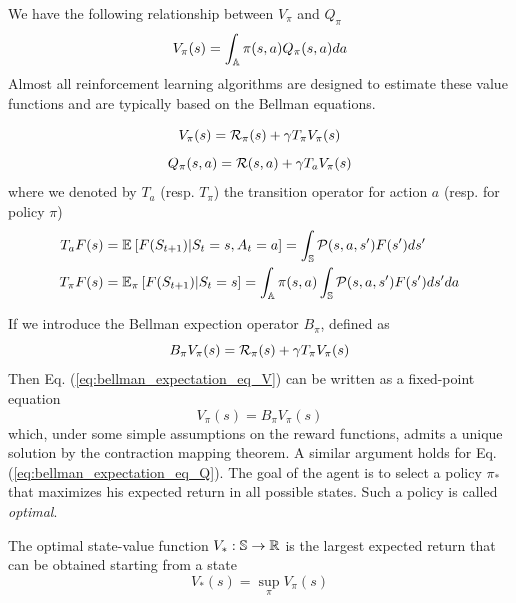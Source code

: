 We have the following relationship between $V_\pi$ and $Q_\pi$
\begin{equation}
	V_\pi(s) = \int_\A \pi(s,a) Q_\pi(s,a) da
\end{equation}
Almost all reinforcement learning algorithms are designed to estimate these 
value functions and are typically based on the Bellman equations.
\begin{proposition}
	\begin{equation}
		V_\pi(s) = \calR_\pi(s) + \gamma T_\pi V_\pi(s)	
		\label{eq:bellman_expectation_eq_V}
	\end{equation}
	\begin{equation}
			Q_\pi(s,a) = \calR(s,a) + \gamma T_a V_\pi(s)
			\label{eq:bellman_expectation_eq_Q}
	\end{equation}
	where we denoted by $T_a$ (resp. $T_\pi$) the transition operator for action 
	$a$ (resp. for policy $\pi$)
	\begin{equation*}
		\begin{split}
			T_a F(s) &= \E{F(S_{t+1})|S_t = s, A_t = a} = \int_\S \calP(s, a, s') F(s') ds'\\
			T_\pi F(s) &= \E[\pi]{F(S_{t+1})|S_t = s} = \int_\A \pi(s,a) \int_\S \calP(s,a,s') F(s') ds'
			da\\ 
		\end{split}
	\end{equation*}
\end{proposition}
If we introduce the Bellman expection operator $B_\pi$, defined as 
\begin{equation*}
	B_\pi V_\pi(s) = \calR_\pi(s) + \gamma T_\pi V_\pi(s)	
\end{equation*}
Then Eq. (\ref{eq:bellman_expectation_eq_V}) can be written as a fixed-point equation
\begin{equation*}
	V_\pi(s) = B_\pi V_\pi(s)
\end{equation*}
which, under some simple assumptions on the reward functions, admits a unique
solution by the contraction mapping theorem. A similar argument holds for Eq.
(\ref{eq:bellman_expectation_eq_Q}). The goal of the agent is to select a policy
$\pi_*$ that maximizes his expected return in all possible states. Such a
policy is called \emph{optimal}.
\begin{definition}
	The optimal state-value function $V_*: \S \to \R$ is the largest expected 
	return that can be obtained starting from a state
	\begin{equation}
		V_*(s) = \sup_\pi V_\pi(s)
	\end{equation}
\end{definition}
